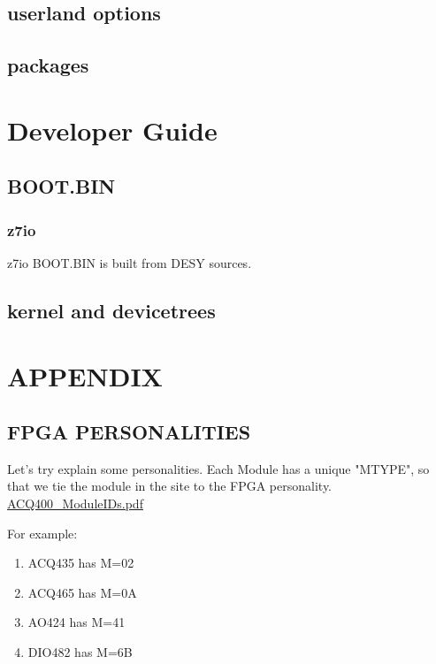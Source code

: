 \documentclass[]{article}
\begin{document}
\subsection{userland options}

\subsection{packages}

\section{Developer Guide}

\subsection{BOOT.BIN}

\subsubsection{z7io}
z7io BOOT.BIN is built from DESY sources.

\subsection{kernel and devicetrees}

\pagebreak

\section{APPENDIX}
	
	
\subsection{FPGA PERSONALITIES}\label{sec:fpga-personalities}

Let's try explain some personalities. Each Module has a unique "MTYPE", so that we tie the module in the site to the FPGA personality. 
\href{https://www.d-tacq.com/resources/Products_ACQ400_ModuleIDs.pdf}{ACQ400_ModuleIDs.pdf}

For example:
\begin{enumerate}
	\item ACQ435 has M=02
	\item ACQ465 has M=0A
	\item AO424  has M=41
	\item DIO482 has M=6B
\end{enumerate}
\end{document}
